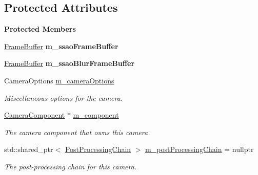 \subsection*{Protected Attributes}
\begin{Indent}\textbf{ Protected Members}\par
\begin{DoxyCompactItemize}
\item 
\mbox{\label{classrev_1_1_scene_camera_ad2660944b619705a1b5c4f588f1d9de2}} 
\mbox{\hyperlink{classrev_1_1_frame_buffer}{Frame\+Buffer}} {\bfseries m\+\_\+ssao\+Frame\+Buffer}
\item 
\mbox{\label{classrev_1_1_scene_camera_a0c760c8b5388a8b92d8768369fca9e47}} 
\mbox{\hyperlink{classrev_1_1_frame_buffer}{Frame\+Buffer}} {\bfseries m\+\_\+ssao\+Blur\+Frame\+Buffer}
\item 
\mbox{\label{classrev_1_1_scene_camera_a8b9e5a4ddd3840fb490ce2bf9be301a1}} 
Camera\+Options \mbox{\hyperlink{classrev_1_1_scene_camera_a8b9e5a4ddd3840fb490ce2bf9be301a1}{m\+\_\+camera\+Options}}
\begin{DoxyCompactList}\small\item\em Miscellaneous options for the camera. \end{DoxyCompactList}\item 
\mbox{\label{classrev_1_1_scene_camera_a9da2048809797bb1320cd8a801bf3378}} 
\mbox{\hyperlink{classrev_1_1_camera_component}{Camera\+Component}} $\ast$ \mbox{\hyperlink{classrev_1_1_scene_camera_a9da2048809797bb1320cd8a801bf3378}{m\+\_\+component}}
\begin{DoxyCompactList}\small\item\em The camera component that owns this camera. \end{DoxyCompactList}\item 
\mbox{\label{classrev_1_1_scene_camera_ae5f3d7b7fc0c7c077f533d14b3ae9f8a}} 
std\+::shared\+\_\+ptr$<$ \mbox{\hyperlink{classrev_1_1_post_processing_chain}{Post\+Processing\+Chain}} $>$ \mbox{\hyperlink{classrev_1_1_scene_camera_ae5f3d7b7fc0c7c077f533d14b3ae9f8a}{m\+\_\+post\+Processing\+Chain}} = nullptr
\begin{DoxyCompactList}\small\item\em The post-\/processing chain for this camera. \end{DoxyCompactList}\item 

\end{DoxyCompactItemize}
\end{Indent}
